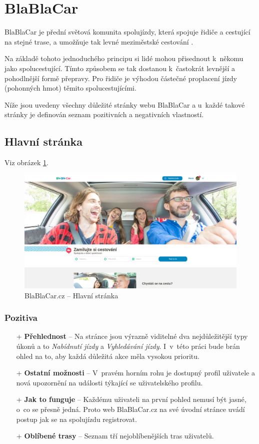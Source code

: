 \section{BlaBlaCar}
\label{analyza:blablacar}

BlaBlaCar je přední světová komunita spolujízdy, která spojuje řidiče a cestující na stejné trase, a umožňuje tak levné meziměstské cestování \cite{blablacar}.

Na základě tohoto jednoduchého principu si lidé mohou přisednout k~někomu jako spolucestující. Tímto způsobem se tak dostanou k~častokrát levnější a pohodlnější formě přepravy. Pro řidiče je výhodou částečné proplacení jízdy (pohonných hmot) těmito spolucestujícími.

Níže jsou uvedeny všechny důležité stránky webu BlaBlaCar a u~každé takové stránky je definován seznam pozitivních a negativních vlastností.

\subsection{Hlavní stránka}
Viz obrázek \ref{fig:blablacar:homepage}.
\begin{figure}[h]
    \centering
    \includegraphics[width=1.0\textwidth]{media/blablacar/homepage.png}
    \caption{BlaBlaCar.cz -- Hlavní stránka}
    \label{fig:blablacar:homepage}
\end{figure}
\subsubsection*{Pozitiva}
\begin{itemize}
    \item[+] \textbf{Přehlednost} -- Na stránce jsou výrazně viditelné dva nejdůležitější typy úkonů a to \textit{Nabídnutí jízdy} a \textit{Vyhledávání jízdy}. I~v~této práci bude brán ohled na to, aby každá důležitá akce měla vysokou prioritu.
    \item[+] \textbf{Ostatní možnosti} -- V~pravém horním rohu je dostupný profil uživatele a nová upozornění na události týkající se uživatelského profilu.
    \item[+] \textbf{Jak to funguje} -- Každému uživateli na první pohled nemusí být jasné, o~co se přesně jedná. Proto web BlaBlaCar.cz na své úvodní stránce uvádí postup jak se na spolujízdu registrovat.
    \item[+] \textbf{Oblíbené trasy} -- Seznam tří nejoblíbenějších tras uživatelů.
\end{itemize}
